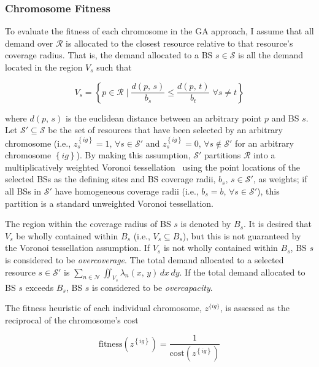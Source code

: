 \documentclass[12pt,dvipsnames]{report}
\begin{document}
\subsubsection{Chromosome Fitness}

To evaluate the fitness of each chromosome in the GA approach, I assume that all demand over $\mathcal{R}$ is allocated to the closest resource relative to that resource's coverage radius.  That is, the demand allocated to a BS $s \in \mathcal{S}$ is all the demand located in the region $V_s$ such that

\begin{equation}
V_s = \left\{ p \in \mathcal{R} \mid \frac{d \left( p,\, s \right)}{b_s} \leq \frac{d \left( p,\, t \right)}{b_t} \; \forall s \neq t \right\}
\end{equation}

\noindent where $d \left( p,\, s \right)$ is the euclidean distance between an arbitrary point $p$ and BS $s$.  Let $\mathcal{S}' \subseteq \mathcal{S}$ be the set of resources that have been selected by an arbitrary chromosome (i.e., $z_s^{\left\{ ig \right\}} = 1,\, \forall s \in \mathcal{S}'$ and $z_s^{\left\{ ig \right\}} = 0,\, \forall s \not\in \mathcal{S}'$ for an arbitrary chromosome $\left\{ ig \right\}$).  By making this assumption, $\mathcal{S}'$ partitions $\mathcal{R}$ into a multiplicatively weighted Voronoi tessellation~\cite{Dobrin_areview,AURENHAMMER1984251} using the point locations of the selected BSs as the defining sites and BS coverage radii, $b_s,\, s \in \mathcal{S}'$, as weights; if all BSs in $\mathcal{S}'$ have homogeneous coverage radii (i.e., $b_s = b,\, \forall s \in \mathcal{S}'$), this partition is a standard unweighted Voronoi tessellation.

The region within the coverage radius of BS $s$ is denoted by $B_s$.  It is desired that $V_s$ be wholly contained within $B_s$ (i.e., $V_s \subseteq B_s$), but this is not guaranteed by the Voronoi tessellation assumption.  If $V_s$ is not wholly contained within $B_s$, BS $s$ is considered to be \emph{overcoverage}.  The total demand allocated to a selected resource $s \in \mathcal{S}'$ is $\sum_{n \in \mathcal{N}} \iint_{V_s} \lambda_n \left( x,\, y \right) \,dx \,dy$.  If the total demand allocated to BS $s$ exceeds $B_s$, BS $s$ is considered to be \emph{overcapacity}.

The fitness heuristic of each individual chromosome, $z^{\{ig\}}$, is assessed as the reciprocal of the chromosome's cost

\begin{equation} \label{eq:GAFit}
\mathrm{fitness}\left( z^{\left\{ ig \right\}} \right) = \frac{1}{\mathrm{cost}\left( z^{\left\{ ig \right\}} \right)}
\end{equation}
\end{document}
